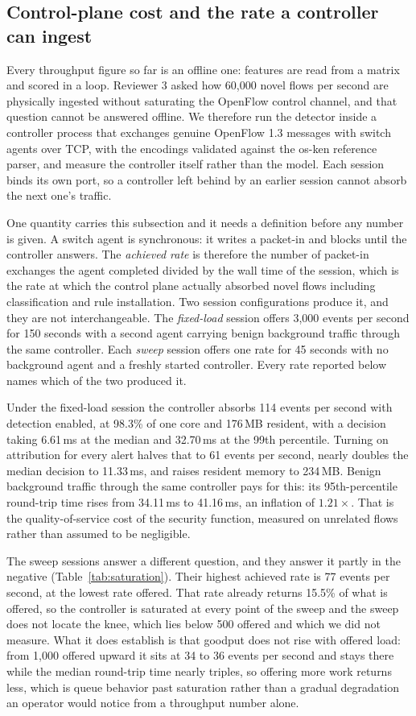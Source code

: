 \documentclass{ieeeaccess}
\begin{document}
\subsection{Control-plane cost and the rate a controller can ingest}
\label{sec:deployment}
Every throughput figure so far is an offline one: features are read from a matrix
and scored in a loop. Reviewer 3 asked how 60,000 novel flows per second are
physically ingested without saturating the OpenFlow control channel, and that
question cannot be answered offline. We therefore run the detector inside a
controller process that exchanges genuine OpenFlow 1.3 messages with switch
agents over TCP, with the encodings validated against the os-ken reference
parser, and measure the controller itself rather than the model. Each session
binds its own port, so a controller left behind by an earlier session cannot
absorb the next one's traffic.

One quantity carries this subsection and it needs a definition before any number
is given. A switch agent is synchronous: it writes a packet-in and blocks until
the controller answers. The \emph{achieved rate} is therefore the number of
packet-in exchanges the agent completed divided by the wall time of the session,
which is the rate at which the control plane actually absorbed novel flows
including classification and rule installation. Two session configurations
produce it, and they are not interchangeable. The \emph{fixed-load} session
offers 3,000 events per second for 150 seconds with a second agent carrying
benign background traffic through the same controller. Each \emph{sweep} session
offers one rate for 45 seconds with no background agent and a freshly started
controller. Every rate reported below names which of the two produced it.

Under the fixed-load session the controller absorbs 114 events per second with
detection enabled, at 98.3\% of one core and 176\,MB resident, with a decision
taking 6.61\,ms at the median and 32.70\,ms at the 99th percentile. Turning on
attribution for every alert halves that to 61 events per second, nearly doubles
the median decision to 11.33\,ms, and raises resident memory to 234\,MB. Benign
background traffic through the same controller pays for this: its
95th-percentile round-trip time rises from 34.11\,ms to 41.16\,ms, an inflation
of $1.21\times$. That is the quality-of-service cost of the security function,
measured on unrelated flows rather than assumed to be negligible.

The sweep sessions answer a different question, and they answer it partly in the
negative (Table~\ref{tab:saturation}). Their highest achieved rate is 77 events
per second, at the lowest rate offered. That rate already returns 15.5\% of what
is offered, so the controller is saturated at every point of the sweep and the
sweep does not locate the knee, which lies below 500 offered and which we did not
measure. What it does establish is that goodput does not rise with offered load:
from 1,000 offered upward it sits at 34 to 36 events per second and stays there
while the median round-trip time nearly triples, so offering more work returns
less, which is queue behavior past saturation rather than a gradual degradation
an operator would notice from a throughput number alone.
\end{document}
